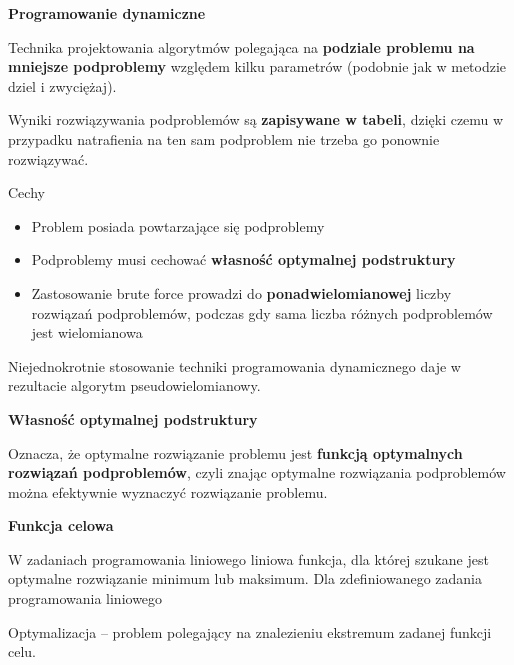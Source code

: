 \documentclass[12pt]{article}
\begin{document}
    \begin{definition}
        \textbf{Programowanie dynamiczne}

        Technika projektowania algorytmów polegająca na \textbf{podziale problemu na mniejsze podproblemy} względem kilku parametrów (podobnie jak w metodzie dziel i zwyciężaj).

        Wyniki rozwiązywania podproblemów są  \textbf{zapisywane w tabeli}, dzięki czemu w przypadku natrafienia na ten sam podproblem nie trzeba go ponownie rozwiązywać.

        Cechy
        \begin{itemize}
            \item Problem posiada powtarzające się podproblemy
            \item Podproblemy musi cechować \textbf{własność optymalnej podstruktury}
            \item Zastosowanie brute force prowadzi do \textbf{ponadwielomianowej} liczby rozwiązań podproblemów, podczas gdy sama liczba różnych podproblemów jest wielomianowa
        \end{itemize}

        Niejednokrotnie stosowanie techniki programowania dynamicznego daje w rezultacie algorytm pseudowielomianowy.
    \end{definition}

    \begin{definition}
        \textbf{Własność optymalnej podstruktury}

        Oznacza, że optymalne rozwiązanie problemu jest \textbf{funkcją optymalnych rozwiązań podproblemów}, czyli znając optymalne rozwiązania podproblemów można efektywnie wyznaczyć rozwiązanie problemu.
    \end{definition}

    \begin{definition}
        \textbf{Funkcja celowa}

        W zadaniach programowania liniowego liniowa funkcja, dla której szukane jest optymalne rozwiązanie minimum lub maksimum. Dla zdefiniowanego zadania programowania liniowego

        Optymalizacja – problem polegający na znalezieniu ekstremum zadanej funkcji celu.
    \end{definition}
\end{document}

